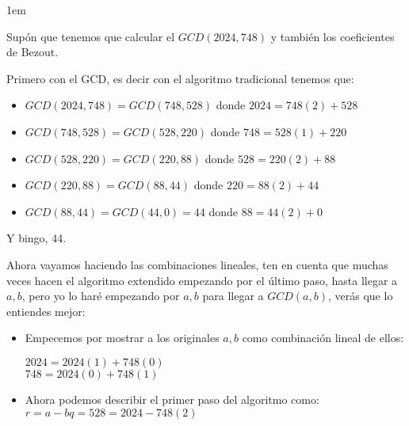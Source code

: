 \documentclass[12pt]{report}                                    %
\newcommand \Quote {\qq}                                        %
\newenvironment{SmallIndentation}[1][0.75em]                    %
    {\begin{adjustwidth}{#1}{}\begin{footnotesize}}                 %
    {\end{footnotesize}\end{adjustwidth}}                           %
\begin{document}
            \begin{SmallIndentation}[1em]
                Supón que tenemos que calcular el $GCD(2024, 748)$
                y también los coeficientes de Bezout.

                Primero con el GCD, es decir con el algoritmo tradicional
                tenemos que:

                \begin{itemize}
                    \item $GCD(2024, 748) = GCD(748, 528)$   donde $2024=748(2)+528$

                    \item $GCD(748, 528)  = GCD(528, 220)$   donde $748=528(1)+220$

                    \item $GCD(528, 220)  = GCD(220, 88)$    donde $528=220(2)+88$

                    \item $GCD(220, 88)   = GCD(88, 44)$     donde $220=88(2)+44$

                    \item $GCD(88, 44)    = GCD(44, 0) = 44$ donde $88=44(2)+0$
                \end{itemize}

                Y bingo, 44.


                Ahora vayamos haciendo las combinaciones lineales, 
                ten en cuenta que muchas veces hacen el algoritmo extendido empezando
                por el último paso, hasta llegar a $a,b$, pero yo lo haré \Quote{al réves}
                empezando por $a,b$ para llegar a $GCD(a,b)$, verás que lo entiendes mejor:


                \begin{itemize}
                    \item
                        Empecemos por mostrar a los originales $a,b$ como combinación lineal
                        de ellos:

                        $2024 = 2024(1) + 748(0)$\\
                        $748  = 2024(0) + 748(1)$

                    \item
                        Ahora podemos describir el primer paso del algoritmo como:\\
                        $r = a - bq = 528 = 2024 - 748(2)$


\end{itemize}
\end{SmallIndentation}
\end{document}
